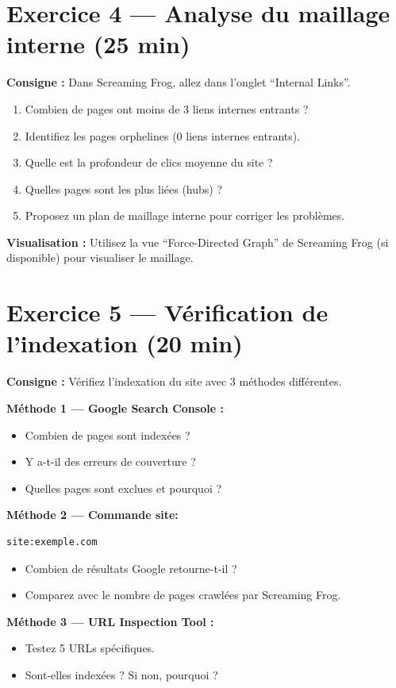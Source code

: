 \documentclass[12pt,a4paper]{report}
\begin{document}
\section{Exercice 4 --- Analyse du maillage interne (25 min)}

\textbf{Consigne :} Dans Screaming Frog, allez dans l'onglet ``Internal Links''.

\begin{enumerate}
\item Combien de pages ont moins de 3 liens internes entrants ?
\item Identifiez les pages orphelines (0 liens internes entrants).
\item Quelle est la profondeur de clics moyenne du site ?
\item Quelles pages sont les plus liées (hubs) ?
\item Proposez un plan de maillage interne pour corriger les problèmes.
\end{enumerate}

\textbf{Visualisation :} Utilisez la vue ``Force-Directed Graph'' de Screaming Frog (si disponible) pour visualiser le maillage.

\section{Exercice 5 --- Vérification de l'indexation (20 min)}

\textbf{Consigne :} Vérifiez l'indexation du site avec 3 méthodes différentes.

\textbf{Méthode 1 --- Google Search Console :}
\begin{itemize}
\item Combien de pages sont indexées ?
\item Y a-t-il des erreurs de couverture ?
\item Quelles pages sont exclues et pourquoi ?
\end{itemize}

\textbf{Méthode 2 --- Commande site:}
\begin{lstlisting}
site:exemple.com
\end{lstlisting}
\begin{itemize}
\item Combien de résultats Google retourne-t-il ?
\item Comparez avec le nombre de pages crawlées par Screaming Frog.
\end{itemize}

\textbf{Méthode 3 --- URL Inspection Tool :}
\begin{itemize}
\item Testez 5 URLs spécifiques.
\item Sont-elles indexées ? Si non, pourquoi ?
\end{itemize}
\end{document}
